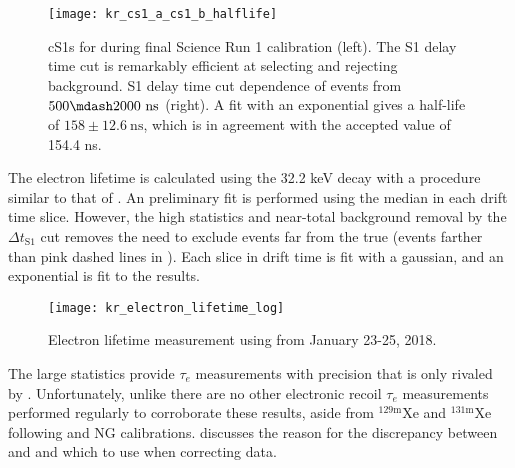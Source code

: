 \begin{figure}
\centering
\texttt{[image: kr\_cs1\_a\_cs1\_b\_halflife]}
\caption[cS1s for \metakr during final Science Run 1 calibration (left) and S1 delay time cut dependence of events from
$500 \mdash 2000\ \mathrm{ns}$.]{cS1s for \metakr during final Science Run 1 calibration (left).  The S1 delay time cut is remarkably efficient at selecting
\metakr and rejecting background.  S1 delay time cut dependence of events from $500 \mdash 2000\ \mathrm{ns}$ (right).  A fit with
an exponential gives a half-life of $158 \pm 12.6\ \mathrm{ns}$, which is in agreement with the accepted value of 154.4 ns.}
\label{fig:electron_lifetimes_measurement_kr_cs1_halflife}
\end{figure}

The electron lifetime is calculated using the 32.2 keV decay with a procedure similar to that of \alphadecays
{}.  An preliminary fit is performed using the median \stwob in each drift time
slice.  However, the high statistics and near-total background removal by the $\Delta t_{\mathrm{S1}}$ cut
removes the need to exclude events far from the true \metakr (events farther than pink dashed lines in
).  Each slice in drift time is fit with a gaussian, and an exponential
is fit to the results.

\begin{figure}
\centering
\texttt{[image: kr\_electron\_lifetime\_log]}
\caption{Electron lifetime measurement using \metakr from January 23-25, 2018.}
\label{fig:electron_lifetimes_measurement_kr_elifetime}
\end{figure}

The large statistics provide $\tau_e$ measurements with precision that is only rivaled by .  Unfortunately, unlike
\alphadecays there are no other electronic recoil $\tau_e$ measurements performed regularly to corroborate these results, aside from
$\mathrm{^{129m}Xe}$ and $\mathrm{^{131m}Xe}$ following \ambe and NG calibrations.  
discusses the reason for the discrepancy between \alphadecays and \metakr and which to use when correcting data.



